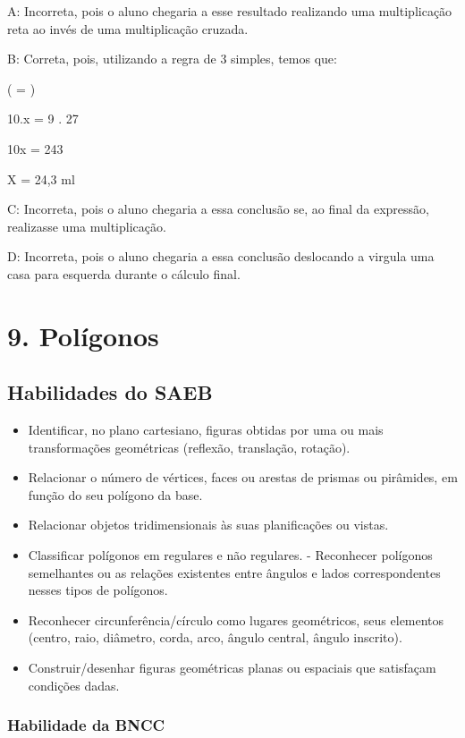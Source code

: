 {A: Incorreta, pois o aluno chegaria a esse resultado realizando uma
multiplicação reta ao invés de uma multiplicação cruzada.

B: Correta, pois, utilizando a regra de 3 simples, temos que:

( = )

10.x = 9 . 27

10x = 243

X = 24,3 ml

C: Incorreta, pois o aluno chegaria a essa conclusão se, ao final da
expressão, realizasse uma multiplicação.

D: Incorreta, pois o aluno chegaria a essa conclusão deslocando a
virgula uma casa para esquerda durante o cálculo final.


\chapter{9. Polígonos}

\section{Habilidades do SAEB}

\begin{itemize}
\item Identificar, no plano cartesiano, figuras obtidas
por uma ou mais transformações geométricas (reflexão, translação,
rotação).
\item
  Relacionar o número de vértices, faces ou arestas de prismas ou
  pirâmides, em função do seu polígono da base.
\item
  Relacionar objetos tridimensionais às suas planificações ou vistas.
\item
  Classificar polígonos em regulares e não regulares. - Reconhecer
  polígonos semelhantes ou as relações existentes entre ângulos e lados
  correspondentes nesses tipos de polígonos.
\item
  Reconhecer circunferência/círculo como lugares geométricos, seus
  elementos (centro, raio, diâmetro, corda, arco, ângulo central, ângulo
  inscrito).
\item
  Construir/desenhar figuras geométricas planas ou espaciais que
  satisfaçam condições dadas.
\end{itemize}

\subsection{Habilidade da BNCC}

}
